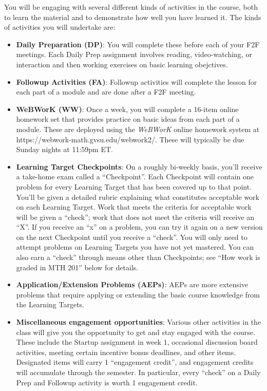 \documentclass[]{article}
\providecommand{\tightlist}{%
  \setlength{\itemsep}{0pt}\setlength{\parskip}{0pt}}
\begin{document}
You will be engaging with several different kinds of activities in the
course, both to learn the material and to demonstrate how well you have
learned it. The kinds of activities you will undertake are:

\begin{itemize}
\tightlist
\item
  \textbf{Daily Preparation (DP)}: You will complete these before each
  of your F2F meetings. Each Daily Prep assignment involves reading,
  video-watching, or interaction and then working exercises on basic
  learning obejctives.
\item
  \textbf{Followup Activities (FA)}: Followup activities will complete
  the lesson for each part of a module and are done after a F2F meeting.
\item
  \textbf{WeBWorK (WW)}: Once a week, you will complete a 16-item online
  homework set that provides practice on basic ideas from each part of a
  module. These are deployed using the \emph{WeBWorK} online homework
  system at https://webwork-math.gvsu.edu/webwork2/. These will
  typically be due Sunday nights at 11:59pm ET.
\item
  \textbf{Learning Target Checkpoints}: On a roughly bi-weekly basis,
  you'll receive a take-home exam called a ``Checkpoint''. Each
  Checkpoint will contain one problem for every Learning Target that has
  been covered up to that point. You'll be given a detailed rubric
  explaining what constitutes acceptable work on each Learning Target.
  Work that meets the criteria for acceptable work will be given a
  ``check''; work that does not meet the criteria will receive an ``X''.
  If you receive an ``x'' on a problem, you can try it again on a new
  version on the next Checkpoint until you receive a ``check''. You will
  only need to attempt problems on Learning Targets you have not yet
  mastered. You can also earn a ``check'' through means other than
  Checkpoints; see ``How work is graded in MTH 201'' below for details.
\item
  \textbf{Application/Extension Problems (AEPs)}: AEPs are more
  extensive problems that require applying or extending the basic course
  knowledge from the Learning Targets.
\item
  \textbf{Miscellaneous engagement opportunities}: Various other
  activities in the class will give you the opportunity to get and stay
  engaged with the course. These include the Startup assignment in week
  1, occasional discussion board activities, meeting certain incentive
  bonus deadlines, and other items. Designated items will carry 1
  ``engagement credit'', and engagement credits will accumulate through
  the semester. In particular, every ``check'' on a Daily Prep and
  Followup activity is worth 1 engagement credit.
\end{itemize}
\end{document}
